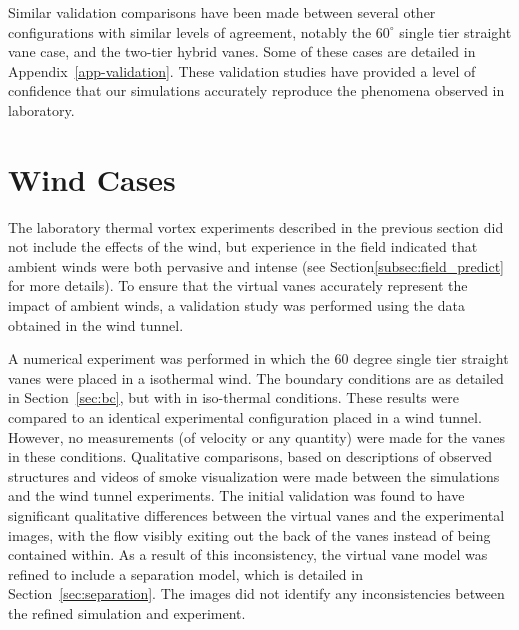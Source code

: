 Similar validation comparisons have been made between several other
configurations with similar levels of agreement,  notably the
$60^{\circ}$ single tier straight vane case, and the two-tier hybrid
vanes. Some of these cases are detailed in Appendix~\ref{app-validation}.
These validation studies have provided a level of confidence that our
simulations accurately reproduce the phenomena observed in laboratory.


\section{Wind Cases}

The laboratory thermal vortex experiments described in the previous
section did not include the effects of the wind, but experience in
the field indicated that ambient winds were both pervasive and intense
(see Section\ref{subsec:field_predict} for more details). To ensure that
the virtual vanes accurately represent the impact of ambient winds, a
validation study was performed using the data obtained in the wind
tunnel. 

A numerical experiment was performed in which the 60 degree single tier
straight vanes were placed in a isothermal wind. The boundary conditions
are as detailed in Section~\ref{sec:bc}, but with in iso-thermal
conditions. These results were compared to an identical experimental
configuration placed in a wind tunnel. However, no measurements (of
velocity or any quantity) were made for the vanes in these
conditions. Qualitative comparisons, based on descriptions of observed
structures and videos of smoke visualization were made between the
simulations and the wind tunnel experiments. The initial validation was
found to have significant qualitative differences between the virtual
vanes and the experimental images, with the flow visibly exiting out the
back of the vanes instead of being contained within.  As a result of
this inconsistency, the virtual vane model was refined to include a
separation model, which is detailed in Section~\ref{sec:separation}. The
images  did not identify any inconsistencies between the refined
simulation and experiment.   

